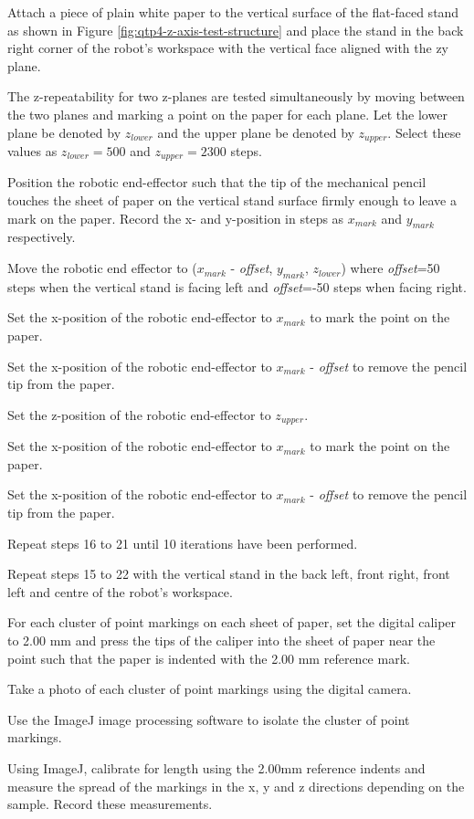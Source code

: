 \begin{compactenum}
	\item Attach a piece of plain white paper to the vertical surface of the flat-faced stand as shown in Figure \ref{fig:qtp4-z-axis-test-structure} and place the stand in the back right corner of the robot's workspace with the vertical face aligned with the zy plane.
	\item The z-repeatability for two z-planes are tested simultaneously by moving between the two planes and marking a point on the paper for each plane. Let the lower plane be denoted by $z_{lower}$ and the upper plane be denoted by $z_{upper}$. Select these values as $z_{lower}=500$ and $z_{upper}=2300$ steps.
	\item Position the robotic end-effector such that the tip of the mechanical pencil touches the sheet of paper on the vertical stand surface firmly enough to leave a mark on the paper. Record the x- and y-position in steps as $x_{mark}$ and $y_{mark}$ respectively.
	\item Move the robotic end effector to ($x_{mark}$ - \textit{offset}, $y_{mark}$, $z_{lower}$) where \textit{offset}=50 steps when the vertical stand is facing left and \textit{offset}=-50 steps when facing right.
	\item Set the x-position of the robotic end-effector to $x_{mark}$ to mark the point on the paper.
	\item Set the x-position of the robotic end-effector to $x_{mark}$ - \textit{offset} to remove the pencil tip from the paper.
	\item Set the z-position of the robotic end-effector to $z_{upper}$.
	\item Set the x-position of the robotic end-effector to $x_{mark}$ to mark the point on the paper.
	\item Set the x-position of the robotic end-effector to $x_{mark}$ - \textit{offset} to remove the pencil tip from the paper.
	\item Repeat steps 16 to 21 until 10 iterations have been performed.
	\item Repeat steps 15 to 22 with the vertical stand in the back left, front right, front left and centre of the robot's workspace.
	\item For each cluster of point markings on each sheet of paper, set the digital caliper to 2.00 mm and press the tips of the caliper into the sheet of paper near the point such that the paper is indented with the 2.00 mm reference mark.
	\item Take a photo of each cluster of point markings using the digital camera.
	\item Use the ImageJ image processing software to isolate the cluster of point markings.
	\item Using ImageJ, calibrate for length using the 2.00mm reference indents and measure the spread of the markings in the x, y and z directions depending on the sample. Record these measurements.
\end{compactenum}

